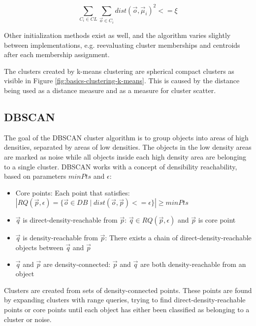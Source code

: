 \documentclass[pdftex,12pt,a4paper]{report}
\begin{document}
\begin{equation}
\sum\limits_{C_i \in CL} \sum\limits_{\vec{o} \in C_i} dist(\vec{o}, \vec{\mu}_i)^2 <= \xi
\end{equation}

Other initialization methods exist as well, and the algorithm varies slightly between implementations, e.g. reevaluating cluster memberships and centroids after each membership assignment. 

The clusters created by k-means clustering are spherical compact clusters as visible in Figure \ref{fig:basics-clustering-k-means}. This is caused by the distance being used as a distance measure and as a measure for cluster scatter.

\subsection{DBSCAN}

The goal of the DBSCAN cluster algorithm is to group objects into areas of high densities, separated by areas of low densities. The objects in the low density areas are marked as noise while all objects inside each high density area are belonging to a single cluster. DBSCAN works with a concept of densibility reachability, based on parameters $minPts$ and $\epsilon$:

\begin{itemize}
	\item
	Core points: Each point that satisfies: \\$|RQ(\vec{p}, \epsilon) = \{  \vec{o} \in DB \mid dist(\vec{o},\vec{p}) <= \epsilon  \}| \geq minPts$
	
	 \item
	 $\vec{q}$ is direct-density-reachable from $\vec{p}$: $\vec{q} \in RQ(\vec{p}, \epsilon)$ and $\vec{p}$ is core point
	 
	 \item
	 $\vec{q}$ is density-reachable from $\vec{p}$: There exists a chain of direct-density-reachable objects between $\vec{q}$ and $\vec{p}$
	 
	 \item
	 $\vec{q}$ and $\vec{p}$ are density-connected: $\vec{p}$ and $\vec{q}$ are both density-reachable from an object
\end{itemize}

Clusters are created from sets of density-connected points. These points are found by expanding clusters with range queries, trying to find direct-density-reachable points or core points until each object has either been classified as belonging to a cluster or noise.
\end{document}
